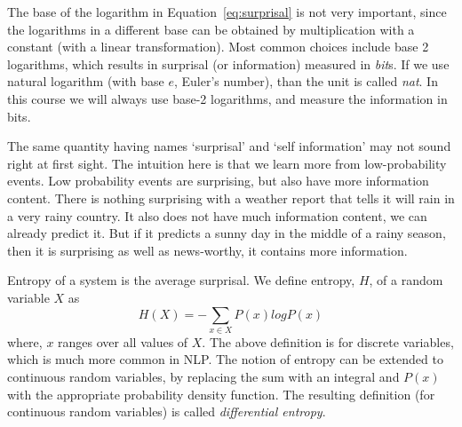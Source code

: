 The base of the logarithm in Equation~\ref{eq:surprisal}
is not very important,
since the logarithms in a different base can be obtained
by multiplication with a constant
(with a linear transformation).
Most common choices include base \num{2} logarithms,
which results in surprisal (or information) measured in \emph{bit}s.
If we use natural logarithm (with base $e$, Euler's number),
than the unit is called \emph{nat}.
In this course we will always use base-\num{2} logarithms,
and measure the information in bits.

The same quantity having names `surprisal' and `self information'
may not sound right at first sight.
The intuition here is that
we learn more from low-probability events.
Low probability events are surprising,
but also have more information content.
There is nothing surprising with
a weather report that tells it will rain in a very rainy country.
It also does not have much information content,
we can already predict it.
But if it predicts a sunny day in the middle of a rainy season,
then it is surprising as well as news-worthy,
it contains more information.

% 

Entropy of a system is the average surprisal.
We define entropy, $H$, of a random variable $X$ as
\begin{equation}\label{eq:entropy}
  H(X) = - \sum_{x \in X} P(x) log P(x)
\end{equation}
where, $x$ ranges over all values of $X$.
The above definition is for discrete variables,
which is much more common in NLP.
The notion of entropy can be extended to continuous random variables,
by replacing the sum with an integral
and $P(x)$ with the appropriate probability density function.
The resulting definition (for continuous random variables)
is called \emph{differential entropy}.

